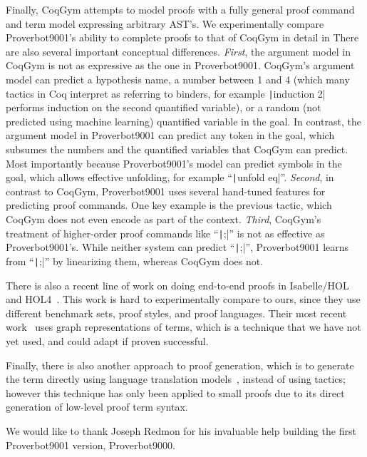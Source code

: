\documentclass[sigplan,screen]{acmart}
\newcommand{\name}{Proverbot9001\xspace}
\newcommand{\coqinline}[1]{\texttt|#1|}
\renewcommand{\>}{\quad}
\begin{document}
Finally, CoqGym attempts to model proofs
  with a fully general proof command and term model expressing arbitrary AST's.
We experimentally compare \name{}'s ability to complete proofs to that of CoqGym
  in detail in 
There are also several important conceptual differences.
\emph{First}, the argument model in CoqGym is not as expressive as the one in \name{}.
CoqGym's argument model can predict a hypothesis name, a number between 1 and 4 (which many tactics in Coq interpret as referring to binders, for example \coqinline{induction 2} performs induction on the second quantified variable), or a random (not predicted using machine learning) quantified variable in the goal.
In contrast, the argument model in \name{} can predict any token in the goal, which subsumes the numbers and the quantified variables that CoqGym can predict.
Most importantly because \name{}'s model can predict symbols in the goal, which allows effective unfolding, for example ``\coqinline{unfold eq}''.
\emph{Second}, in contrast to CoqGym, \name{} uses several hand-tuned features for predicting proof commands.
One key example is the previous tactic, which CoqGym does not even encode as part of the context.
\emph{Third}, CoqGym's treatment of higher-order proof commands like ``\coqinline{;}'' is not as effective as \name{}'s.
While neither system can predict ``\coqinline{;}'', \name{} learns from ``\coqinline{;}'' by linearizing them, whereas CoqGym does not.



There is also a recent line of work on doing end-to-end proofs in Isabelle/HOL and
HOL4~\cite{tactictoe,holist,graph-holist}. This work is hard to experimentally
compare to ours, since they use different benchmark sets, proof styles, and
proof languages. Their most recent work~\cite{graph-holist} uses graph
representations of terms, which is a technique that we have not yet used, and
could adapt if proven successful.

Finally, there is also another approach to proof generation, which is to generate
the term directly using language translation models~\cite{proof-translation},
instead of using tactics; however this technique has only been applied to small
proofs due to its direct generation of low-level proof term syntax.
 
\begin{acks}
  We would like to thank Joseph Redmon for his invaluable help building the first \name{} version, Proverbot9000.
\end{acks}
\end{document}
